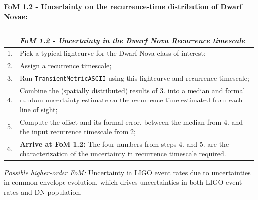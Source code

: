 {\bf FoM 1.2 - Uncertainty on the recurrence-time distribution of
  Dwarf Novae:} 

\begin{table}[h]
  \small
  \begin{tabular}{c p{12cm}}
    & {\it FoM 1.2 - Uncertainty in the Dwarf Nova Recurrence timescale} \\
    \hline
  1. & Pick a typical lightcurve for the Dwarf Nova class of interest; \\
  2. & Assign a recurrence timescale; \\
  3. & Run {\tt TransientMetricASCII} using this lightcurve and recurrence timescale; \\
  4. & Combine the (spatially distributed) results of 3. into a median and formal random uncertainty estimate on the recurrence time estimated from each line of sight; \\
  5. & Compute the offset and its formal error, between the median from 4. and the input recurrence timescale from 2;\\
  6. & {\bf Arrive at FoM 1.2:} The four numbers from steps 4. and 5. are the characterization of the uncertainty in recurrence timescale required. \\
\hline
    \end{tabular}
 \caption{}
  \label{table:pseudoFOM_1p2}
\end{table}

{\it Possible higher-order FoM:} Uncertainty in LIGO event rates due
to uncertainties in common envelope evolution, which drives
uncertainties in both LIGO event rates and DN population.


